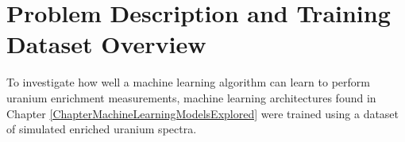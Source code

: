 



\section{Problem Description and Training Dataset Overview}

To investigate how well a machine learning algorithm can learn to perform uranium enrichment measurements, machine learning architectures found in Chapter \ref{ChapterMachineLearningModelsExplored} were trained using a dataset of simulated enriched uranium spectra. 




